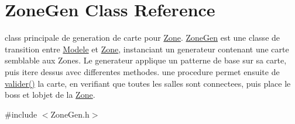 \hypertarget{classZoneGen}{}\section{Zone\+Gen Class Reference}
\label{classZoneGen}


class principale de generation de carte pour \hyperlink{classZone}{Zone}. \hyperlink{classZoneGen}{Zone\+Gen} est une classe de transition entre \hyperlink{classModele}{Modele} et \hyperlink{classZone}{Zone}, instanciant un generateur contenant une carte semblable aux Zones. Le generateur applique un patterne de base sur sa carte, puis \textquotesingle{}itere\textquotesingle{} dessus avec differentes methodes. une procedure permet ensuite de \hyperlink{classZoneGen_ad0f167f538f4e9f3e12908421297250f}{valider()} la carte, en verifiant que toutes les salles sont connectees, puis place le boss et l\textquotesingle{}objet de la \hyperlink{classZone}{Zone}.  




{\ttfamily \#include $<$Zone\+Gen.\+h$>$}

